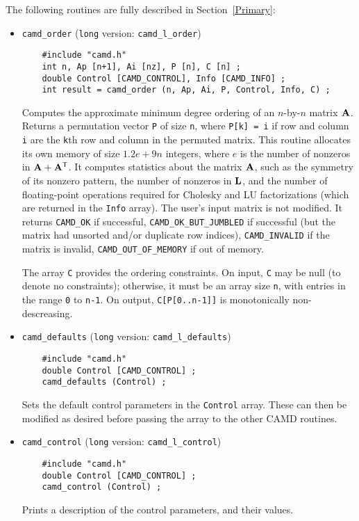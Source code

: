 \documentclass[11pt]{article}
\newcommand{\m}[1]{{\bf{#1}}}       %
\newcommand{\tr}{^{\sf T}}          %
\begin{document}
The following routines are fully described in Section~\ref{Primary}:

\begin{itemize}
\item {\tt camd\_order}
({\tt long} version: {\tt camd\_l\_order})
    {\footnotesize
    \begin{verbatim}
    #include "camd.h"
    int n, Ap [n+1], Ai [nz], P [n], C [n] ;
    double Control [CAMD_CONTROL], Info [CAMD_INFO] ;
    int result = camd_order (n, Ap, Ai, P, Control, Info, C) ;
    \end{verbatim}
    }
    Computes the approximate minimum degree ordering of an $n$-by-$n$ matrix
    $\m{A}$.  Returns a permutation vector {\tt P} of size {\tt n}, where
    {\tt P[k] = i} if row and column {\tt i} are the {\tt k}th row and
    column in the permuted matrix.
    This routine allocates its own memory of size $1.2e+9n$ integers,
    where $e$ is the number of nonzeros in $\m{A}+\m{A}\tr$.
    It computes statistics about the matrix $\m{A}$, such as the symmetry of
    its nonzero pattern, the number of nonzeros in $\m{L}$,
    and the number of floating-point operations required for Cholesky and LU
    factorizations (which are returned in the {\tt Info} array).
    The user's input matrix is not modified.
    It returns {\tt CAMD\_OK} if successful,
    {\tt CAMD\_OK\_BUT\_JUMBLED} if successful (but the matrix had unsorted
    and/or duplicate row indices),
    {\tt CAMD\_INVALID} if the matrix is invalid,
    {\tt CAMD\_OUT\_OF\_MEMORY} if out of memory.

    The array {\tt C} provides the ordering constraints.
    On input, {\tt C} may be null (to denote no constraints);
    otherwise, it must be an array size {\tt n}, with entries in the range
    {\tt 0} to {\tt n-1}.
    On output, {\tt C[P[0..n-1]]} is monotonically non-descreasing.  

\item {\tt camd\_defaults}
({\tt long} version: {\tt camd\_l\_defaults})
    {\footnotesize
    \begin{verbatim}
    #include "camd.h"
    double Control [CAMD_CONTROL] ;
    camd_defaults (Control) ;
    \end{verbatim}
    }
    Sets the default control parameters in the {\tt Control} array.  These can
    then be modified as desired before passing the array to the other CAMD
    routines.

\item {\tt camd\_control}
({\tt long} version: {\tt camd\_l\_control})
    {\footnotesize
    \begin{verbatim}
    #include "camd.h"
    double Control [CAMD_CONTROL] ;
    camd_control (Control) ;
    \end{verbatim}
    }
    Prints a description of the control parameters, and their values.


\end{itemize}
\end{document}
